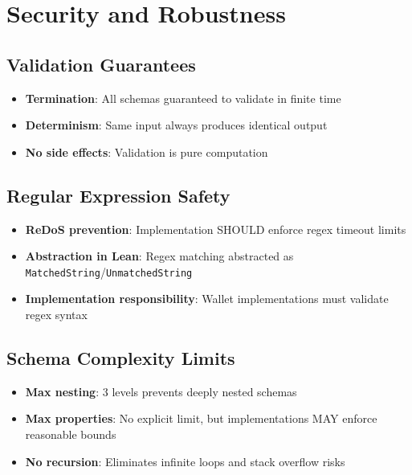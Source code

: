 \section{Security and Robustness}

\subsection{Validation Guarantees}

\begin{itemize}
  \item \textbf{Termination}: All schemas guaranteed to validate in finite time
  \item \textbf{Determinism}: Same input always produces identical output
  \item \textbf{No side effects}: Validation is pure computation
\end{itemize}

\subsection{Regular Expression Safety}

\begin{itemize}
  \item \textbf{ReDoS prevention}: Implementation SHOULD enforce regex timeout limits
  \item \textbf{Abstraction in Lean}: Regex matching abstracted as \texttt{MatchedString}/\texttt{UnmatchedString}
  \item \textbf{Implementation responsibility}: Wallet implementations must validate regex syntax
\end{itemize}

\subsection{Schema Complexity Limits}

\begin{itemize}
  \item \textbf{Max nesting}: 3 levels prevents deeply nested schemas
  \item \textbf{Max properties}: No explicit limit, but implementations MAY enforce reasonable bounds
  \item \textbf{No recursion}: Eliminates infinite loops and stack overflow risks
\end{itemize}

